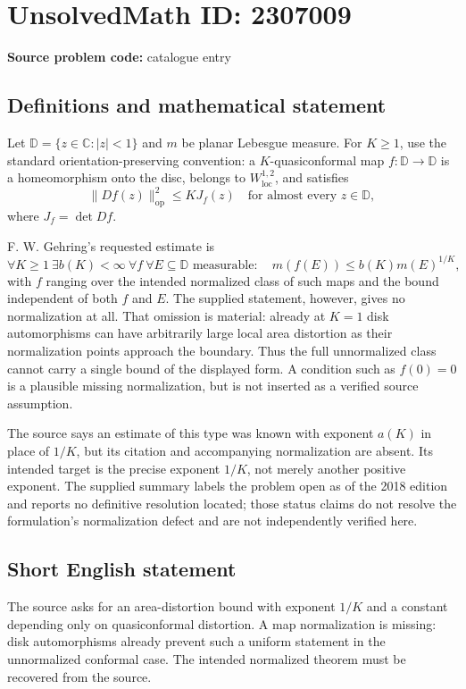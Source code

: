 \documentclass[11pt]{article}
\newcommand{\C}{\mathbb{C}}
\begin{document}
\section*{UnsolvedMath ID: 2307009}
\textbf{Source problem code:} catalogue entry
\subsection{Definitions and mathematical statement}
Let $\mathbb D=\{z\in\C:|z|<1\}$ and $m$ be planar Lebesgue measure. For $K\geq1$, use the standard orientation-preserving convention: a $K$-quasiconformal map $f:\mathbb D\to\mathbb D$ is a homeomorphism onto the disc, belongs to $W^{1,2}_{\mathrm{loc}}$, and satisfies
\[
\|Df(z)\|_{\mathrm{op}}^2\leq KJ_f(z)
\quad\text{for almost every }z\in\mathbb D,
\]
where $J_f=\det Df$.

F. W. Gehring's requested estimate is
\[
\forall K\geq1\ \exists b(K)<\infty\ \forall f\ \forall E\subseteq\mathbb D
\text{ measurable}:\quad
m(f(E))\leq b(K)m(E)^{1/K},
\]
with $f$ ranging over the intended normalized class of such maps and the bound independent of both $f$ and $E$. The supplied statement, however, gives no normalization at all. That omission is material: already at $K=1$ disk automorphisms can have arbitrarily large local area distortion as their normalization points approach the boundary. Thus the full unnormalized class cannot carry a single bound of the displayed form. A condition such as $f(0)=0$ is a plausible missing normalization, but is not inserted as a verified source assumption.

The source says an estimate of this type was known with exponent $a(K)$ in place of $1/K$, but its citation and accompanying normalization are absent. Its intended target is the precise exponent $1/K$, not merely another positive exponent. The supplied summary labels the problem open as of the 2018 edition and reports no definitive resolution located; those status claims do not resolve the formulation's normalization defect and are not independently verified here.
\subsection{Short English statement}
The source asks for an area-distortion bound with exponent $1/K$ and a constant depending only on quasiconformal distortion. A map normalization is missing: disk automorphisms already prevent such a uniform statement in the unnormalized conformal case. The intended normalized theorem must be recovered from the source.
\end{document}
